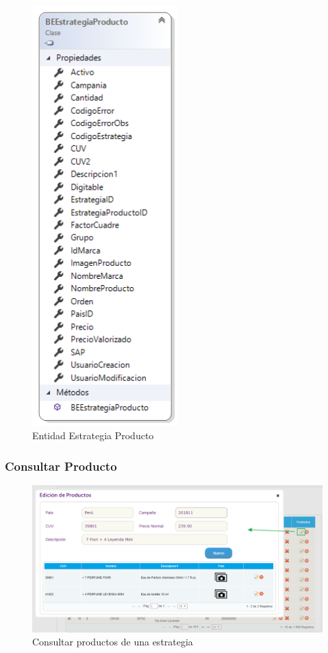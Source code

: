 \documentclass[a4paper,11pt]{paper}
\begin{document}
\newpage
\begin{figure}[h!]
\centering
\includegraphics[width=0.5\textwidth]{imgs/Producto/EntidadProducto.png}
\caption{Entidad Estrategia Producto}
\end{figure}

\newpage
\subsubsection{Consultar Producto}

\begin{figure}[h!]
\centering
\includegraphics[width=1.0\textwidth]{imgs/Producto/FormularioConsultarProducto.png}
\caption{Consultar productos de una estrategia}
\end{figure}
\end{document}
